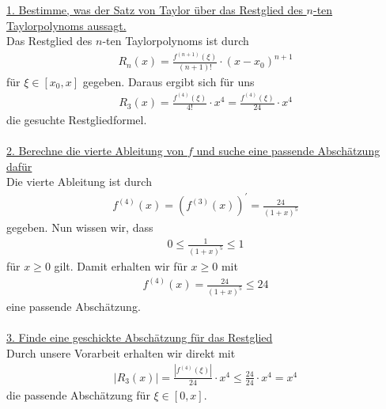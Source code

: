 \underline{1. Bestimme, was der Satz von Taylor über das Restglied des $n$-ten Taylorpolynoms aussagt.}\\
Das Restglied des $n$-ten Taylorpolynoms ist durch
\begin{align*}
R_n(x) = \frac{f^{(n+1)}(\xi)}{(n+1)!}\cdot (x -x_0)^{n+1}
\end{align*}
für $\xi \in [x_0, x]$ gegeben. Daraus ergibt sich für uns
\begin{align*}
R_3(x) = \frac{f^{(4)}(\xi)}{4!}\cdot x^4  
= \frac{f^{(4)}(\xi)}{24} \cdot x^4
\end{align*}
die gesuchte Restgliedformel.
\\
\\
\underline{2. Berechne die vierte Ableitung von $f$ und suche eine passende Abschätzung dafür }\\
Die vierte Ableitung ist durch
\begin{align*}
f^{(4)}(x) = \left(f^{(3)}(x)\right)^\prime = \frac{24}{(1+x)^5}
\end{align*}
gegeben. Nun wissen wir, dass
\begin{align*}
0 \leq \frac{1}{(1+x)^5} \leq 1
\end{align*}
für $x \geq 0 $ gilt. Damit erhalten wir für $x \geq 0$ mit
\begin{align*}
f^{(4)}(x) = \frac{24}{(1+x)^5} \leq 24 
\end{align*}
eine passende Abschätzung.
\\ 
\\
\underline{3. Finde eine geschickte Abschätzung für das Restglied}\\
Durch unsere Vorarbeit erhalten wir direkt mit
\begin{align*}
|R_3(x)| = \frac{|f^{(4)}(\xi)|}{24} \cdot x^4
\leq \frac{24}{24} \cdot x^4 = x^4
\end{align*}
die passende Abschätzung für $\xi \in [0,x]$.

\newpage
